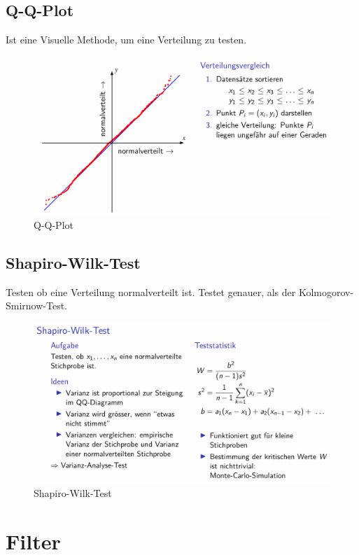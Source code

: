\documentclass[../Main.tex]{subfiles}
\begin{document}
\subsection{Q-Q-Plot}
Ist eine Visuelle Methode, um eine Verteilung zu testen.

\begin{figure}[H]
    \centering
    \includegraphics[width=0.75\linewidth]{Images/q-q-plot.png}
    \caption{Q-Q-Plot}
\end{figure}
\subsection{Shapiro-Wilk-Test}
Testen ob eine Verteilung normalverteilt ist.
Testet genauer, als der Kolmogorov-Smirnow-Test.

\begin{figure}[H]
    \centering
    \includegraphics[width=1\linewidth]{Images/shapiro-wilk-test.png}
    \caption{Shapiro-Wilk-Test}
\end{figure}

\section{Filter}
\end{document}
